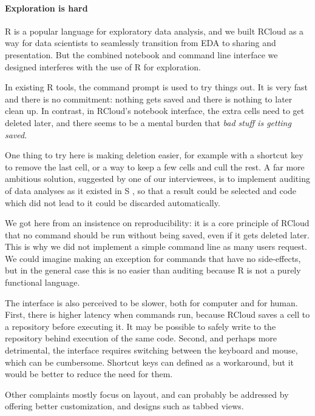 \paragraph*{Exploration is hard}
R is a popular language for exploratory data analysis, and we built RCloud
as a way for data scientists to seamlessly transition from EDA to sharing
and presentation. But the combined notebook and command line interface we
designed interferes with the use of R for exploration.

In existing R tools, the command prompt is used to try things out. It is very
fast and there is no commitment: nothing gets saved and there is nothing to
later clean up. In contrast, in RCloud's notebook interface, the extra cells need
to get deleted later, and there seems to be a mental burden that \emph{bad stuff
is getting saved}.

One thing to try here is making deletion easier, for example with a
shortcut key to remove the last cell, or a way to keep a few cells and cull
the rest. A far more ambitious solution, suggested by one of our
interviewees, is to implement auditing of data analyses as it existed in S
\cite{Becker:1988:Auditing}, so that a result could be selected and code
which did not lead to it could be discarded automatically.

We got here from an insistence on reproducibility: it is a core principle
of RCloud that no command should be run without being saved, even if it
gets deleted later. This is why we did not implement a simple command line
as many users request. We could imagine making an exception for commands
that have no side-effects, but in the general case this is no easier than
auditing because R is not a purely functional language.

The interface is also perceived to be slower, both for computer and for
human. First, there is higher latency when commands run, because
RCloud saves a cell to a repository before executing it. It
may be possible to safely write to the repository behind execution of the
same code. Second, and perhaps more detrimental, the interface requires
switching between the keyboard and mouse, which can be cumbersome.
Shortcut keys can defined as a workaround, but it would be better
to reduce the need for them.

Other complaints mostly focus on layout, and can probably be addressed by
offering better customization, and designs such as tabbed views.

